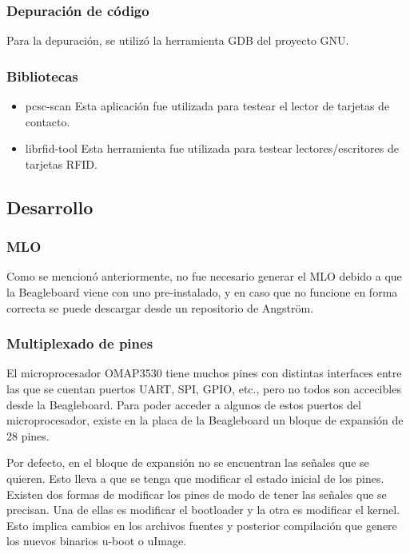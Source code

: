 \documentclass[%
        final,
        notitlepage,
        narroweqnarray,
        inline,
        ]{ieee}
\begin{document}
\subsubsection{Depuración de código}
Para la depuración, se utilizó la herramienta GDB del proyecto GNU. 


\subsubsection{Bibliotecas}

\begin{itemize}
\item pcsc-scan 
Esta aplicación fue utilizada para testear el lector de tarjetas de contacto.
\item  librfid-tool 
Esta herramienta fue utilizada para testear lectores/escritores de tarjetas RFID.
\end{itemize}


\subsection{Desarrollo}

\subsubsection{MLO}
Como se mencionó anteriormente, no fue necesario generar el MLO debido a que la Beagleboard viene con uno pre-instalado, y en caso que no funcione en forma correcta se puede descargar desde un repositorio de Angström. 

\subsubsection{Multiplexado de pines}
El microprocesador OMAP3530 tiene muchos pines con distintas interfaces entre las
que se cuentan puertos UART, SPI, GPIO, etc., pero no todos son accecibles desde la Beagleboard. 
Para poder acceder a algunos de estos puertos del microprocesador, existe en la placa de la
Beagleboard un bloque de expansión de 28 pines.


Por defecto, en el bloque de expansión no se encuentran las señales que se quieren. Esto 
lleva a que se tenga que modificar el estado inicial de los pines. 
Existen dos formas de modificar los pines de modo de tener las señales que se precisan. Una de ellas es modificar el bootloader y la otra es modificar el kernel. Esto implica cambios en los archivos fuentes y posterior compilación que genere los nuevos binarios u-boot o uImage. 
\end{document}
